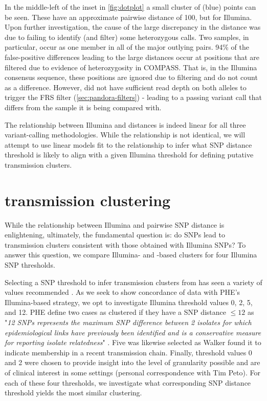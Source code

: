 In the middle-left of the inset in \autoref{fig:dotplot} a small cluster of \pandora{}  (blue) points can be seen. These have an approximate pairwise \ont{} distance of 100, but  for Illumina. Upon further investigation, the cause of the large discrepancy in the distance was due to \pandora{}  failing to identify (and filter) some heterozygous calls. Two samples, in particular, occur as one member in all of the major outlying pairs. 94\% of the false-positive differences leading to the large \ont{} distances occur at positions that are filtered due to evidence of heterozygosity in COMPASS. That is, in the Illumina consensus sequence, these positions are ignored due to filtering and do not count as a difference. However, \pandora{} did not have sufficient read depth on both alleles to trigger the FRS filter (\autoref{sec:pandora-filters}) - leading to a passing variant call that differs from the sample it is being compared with. 

\noindent
The relationship between Illumina and \ont{} distances is indeed linear for all three variant-calling methodologies. While the relationship is not identical, we will attempt to use linear models fit to the relationship to infer what \ont{} SNP distance threshold is likely to align with a given Illumina threshold for defining putative transmission clusters.


\section{\ont{} transmission clustering}
\label{sec:clustering}

While the relationship between Illumina and \ont{} pairwise SNP distance is enlightening, ultimately, the fundamental question is: do \ont{} SNPs lead to transmission clusters consistent with those obtained with Illumina SNPs? To answer this question, we compare Illumina- and \ont{}-based clusters for four Illumina SNP thresholds. 

Selecting a SNP threshold to infer transmission clusters from has seen a variety of values recommended \cite{stimson2019}. As we seek to show concordance of \ont{} data with PHE's Illumina-based strategy, we opt to investigate Illumina threshold values 0, 2, 5, and 12. PHE define two cases as clustered if they have a SNP distance $\le 12$ as "\emph{12 SNPs represents the maximum SNP difference between 2 isolates for which epidemiological links have previously been identified \cite{walker2013} and is a conservative measure for reporting isolate relatedness}" \cite{phe-tb-england}. Five was likewise selected as Walker \etal{} \cite{walker2013} found it to indicate membership in a recent transmission chain. Finally, threshold values 0 and 2 were chosen to provide insight into the level of granularity possible and are of clinical interest in some settings (personal correspondence with Tim Peto). For each of these four thresholds, we investigate what corresponding \ont{} SNP distance threshold yields the most similar clustering.

